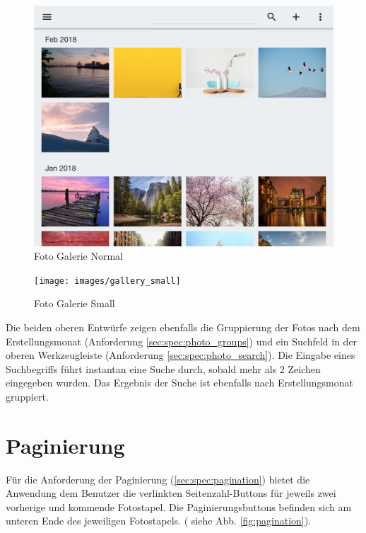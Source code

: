 \begin{figure}[htp]     %
\centering
\includegraphics[width=1.0\textwidth]{images/gallery_normal}
\caption{Foto Galerie Normal}\label{fig:gallery_normal}
\end{figure}

\begin{figure}[htp]     %
\centering
\texttt{[image: images/gallery\_small]}
\caption{Foto Galerie Small}\label{fig:gallery_small}
\end{figure}

Die beiden oberen Entwürfe zeigen ebenfalls die Gruppierung der Fotos nach dem Erstellungsmonat (Anforderung \ref{sec:spec:photo_groups}) und ein Suchfeld in der oberen Werkzeugleiste (Anforderung \ref{sec:spec:photo_search}). Die Eingabe eines Suchbegriffs führt instantan eine Suche durch, sobald mehr als 2 Zeichen eingegeben wurden. Das Ergebnis der Suche ist ebenfalls nach Erstellungsmonat gruppiert.

\section{Paginierung}

Für die Anforderung der Paginierung (\ref{sec:spec:pagination}) bietet die Anwendung dem Benutzer die verlinkten Seitenzahl-Buttons für jeweils zwei vorherige und kommende Fotostapel. Die Paginierungsbuttons befinden sich am unteren Ende des jeweiligen Fotostapels.
( siehe Abb. \ref{fig:pagination}).

